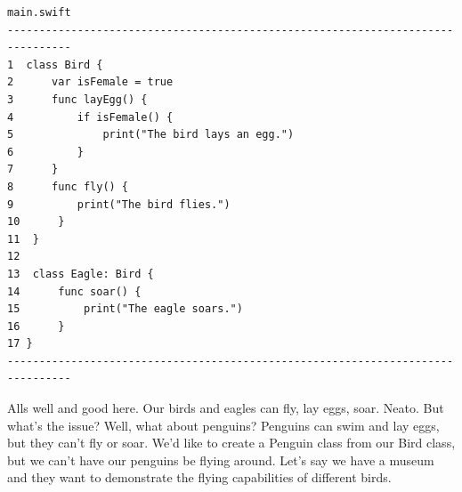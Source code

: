 \documentclass[12pt, letterpaper]{article}
\begin{document}
\begin{verbatim}
main.swift
--------------------------------------------------------------------------------
1  class Bird {
2      var isFemale = true
3      func layEgg() {
4          if isFemale() {
5              print("The bird lays an egg.")
6          }
7      }
8      func fly() {
9          print("The bird flies.")
10      }
11  }
12
13  class Eagle: Bird {
14      func soar() {
15          print("The eagle soars.")
16      }
17 }
--------------------------------------------------------------------------------
\end{verbatim}

Alls well and good here. Our birds and eagles can fly, lay eggs, soar. Neato. But what's the issue? Well, what about 
penguins? Penguins can swim and lay eggs, but they can't fly or soar. We'd like to create a Penguin class from our Bird
class, but we can't have our penguins be flying around. Let's say we have a museum and they want to demonstrate 
the flying capabilities of different birds. 
\end{document}
